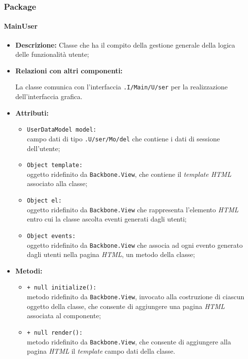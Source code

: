 \subsubsection{Package \logicUser{}}

\paragraph{MainUser}
\label{mainUser}
\begin{flushleft}
\begin{itemize}
\item \textbf{Descrizione:} Classe che ha il compito della gestione generale della logica delle funzionalità utente;
\item \textbf{Relazioni con altri componenti:}
\begin{sloppypar}
La classe comunica con l'interfaccia \texttt{\viewUser{}.I\fshyp{}Main\fshyp{}U\fshyp{}ser} per la realizzazione dell'interfaccia grafica.
\end{sloppypar}
\item \textbf{Attributi:}
\begin{sloppypar}
\begin{itemize}
\item \texttt{UserDataModel model:}\\ campo dati di tipo \texttt{\model{}.U\fshyp{}ser\fshyp{}Mo\fshyp{}del} che contiene i dati di sessione dell'utente;
\item \texttt{Object template:}\\ oggetto ridefinito da \texttt{Backbone.View}, che contiene il \textit{template HTML} associato alla classe;
\item \texttt{Object el:}\\ oggetto ridefinito da \texttt{Backbone.View} che rappresenta l'elemento \textit{HTML} entro cui la classe ascolta eventi generati dagli utenti;
\item \texttt{Object events:}\\ oggetto ridefinito da \texttt{Backbone.View} che associa ad ogni evento generato dagli utenti nella pagina \textit{HTML}, un metodo della classe;
\end{itemize}
\end{sloppypar}
\item \textbf{Metodi:}
\begin{sloppypar}
\begin{itemize}
\item \texttt{+ null initialize():}\\ metodo ridefinito da \texttt{Backbone.View}, invocato alla costruzione di ciascun oggetto della classe, che consente di aggiungere una pagina \textit{HTML} associata al componente;
\item \texttt{+ null render():}\\ metodo ridefinito da \texttt{Backbone.View}, che consente di aggiungere alla pagina \textit{HTML} il \textit{template} campo dati della classe.
\end{itemize}
\end{sloppypar}
\end{itemize}
\end{flushleft}


